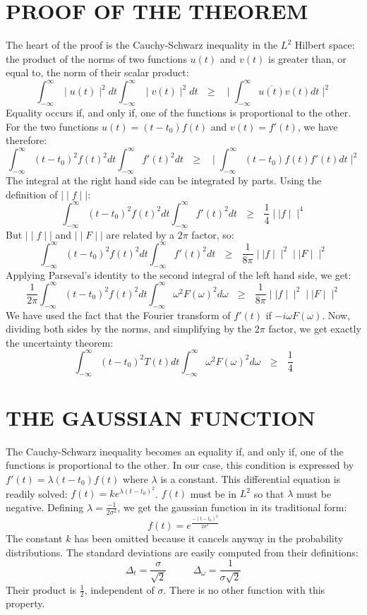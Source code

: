 \documentclass[12pt]{article}
\begin{document}
\section{PROOF OF THE THEOREM}

The heart of the proof is the Cauchy-Schwarz inequality in the $L^2$ Hilbert space: the product of the norms of two functions $u(t)$ and $v(t)$ is greater than, or equal to, the norm of their scalar product:
$$\int_{-\infty}^\infty \mid u(t)\mid ^2 dt\int_{-\infty}^\infty \mid v(t)\mid ^2 dt ~~~\geq~~~
\mid \int_{-\infty}^\infty \overline{u(t)} v(t) dt\mid ^2$$
Equality occurs if, and only if, one of the functions is proportional to the other. For the two functions $u(t) = (t-t_0)f(t)$ and $v(t) = f'(t)$, we have therefore:
$$\int_{-\infty}^\infty (t-t_0)^2 f(t)^2 dt \int_{-\infty}^\infty f'(t)^2 dt   ~~~\geq~~~  \mid\int_{-\infty}^\infty (t-t_0)f(t)f'(t)dt \mid ^2$$
The integral at the right hand side can be integrated by parts. Using the definition of $\mid\mid f\mid\mid$:
$$\int_{-\infty}^\infty (t-t_0)^2 f(t)^2 dt \int_{-\infty}^\infty f'(t)^2 dt   ~~~\geq~~~ \frac{1}{4}\mid\mid f\mid\mid^4$$
But $\mid\mid f\mid\mid$ and $\mid\mid F\mid\mid$ are related by a $2\pi$ factor, so:
$$\int_{-\infty}^\infty (t-t_0)^2 f(t)^2 dt \int_{-\infty}^\infty f'(t)^2 dt   ~~~\geq~~~ \frac{1}{8\pi}\mid\mid f\mid\mid^2\mid\mid F\mid\mid^2$$
Applying Parseval's identity to the second integral of the left hand side, we get:
$$\frac{1}{2\pi}\int_{-\infty}^\infty (t-t_0)^2 f(t)^2 dt \int_{-\infty}^\infty \omega^2
F(\omega)^2 d\omega ~~~\geq~~~ \frac{1}{8\pi}\mid\mid f\mid\mid^2\mid\mid F\mid\mid^2$$
We have used the fact that the Fourier transform of $f'(t)$ if $-i\omega F(\omega)$. \newline
Now, dividing both sides by the norms, and simplifying by the $2\pi$ factor, we get exactly the uncertainty theorem:
$$\int_{-\infty}^\infty (t-t_0)^2 T(t) dt \int_{-\infty}^\infty \omega^2
F(\omega)^2 d\omega   ~~~\geq~~~ \frac{1}{4}$$

\section{THE GAUSSIAN FUNCTION}

The Cauchy-Schwarz inequality becomes an equality if, and only if, one of the functions is proportional to the other. In our case, this condition is expressed by $f'(t)=\lambda(t-t_0)f(t)$ where $\lambda$ is a constant. This differential equation is readily solved: $f(t)=ke^{\lambda (t-t_0)^2}$. $f(t)$ must be in $L^2$ so that $\lambda$ must be negative. Defining $\lambda = \frac{-1}{2\sigma^2}$, we get the gaussian function in its traditional form: $$f(t)=e^{\frac{-(t-t_0)^2}{2\sigma^2}}$$ The constant $k$ has been omitted because it cancels anyway in the probability distributions. The standard deviations are easily computed from their definitions:
$$\Delta_t = \frac{\sigma}{\sqrt{2}} \hspace{32pt} \Delta_\omega = \frac{1}{\sigma\sqrt{2}}$$
Their product is $\frac{1}{2}$, independent of $\sigma$. There is no other function with this property.
\end{document}
